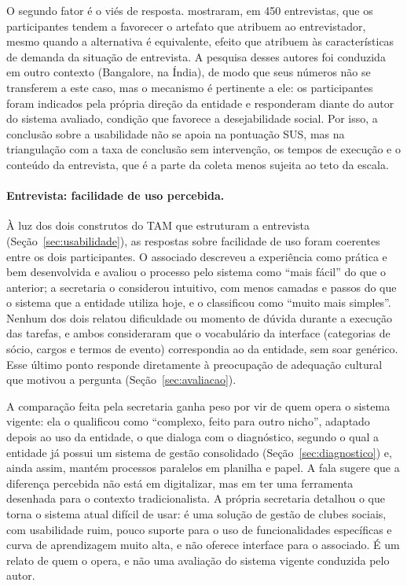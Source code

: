\documentclass[12pt,a4paper]{article}
\begin{document}
O segundo fator é o viés de resposta. \textcite{dell2012}
mostraram, em 450 entrevistas, que os participantes tendem a favorecer o artefato que atribuem ao
entrevistador, mesmo quando a alternativa é equivalente, efeito que atribuem às características de
demanda da situação de entrevista. A pesquisa desses autores foi conduzida em outro contexto
(Bangalore, na Índia), de modo que seus números não se transferem a este caso, mas o
mecanismo é pertinente a ele: os participantes foram indicados pela própria direção da entidade e
responderam diante do autor do sistema avaliado, condição que favorece a desejabilidade social.
Por isso, a conclusão sobre a usabilidade não se apoia na pontuação SUS, mas na triangulação com a
taxa de conclusão sem intervenção, os tempos de execução e o conteúdo da entrevista, que é a parte
da coleta menos sujeita ao teto da escala.

\paragraph{Entrevista: facilidade de uso percebida.} À luz dos dois construtos do TAM
\parencite{davis1989} que estruturam a entrevista (Seção~\ref{sec:usabilidade}), as respostas sobre
facilidade de uso foram coerentes entre os dois participantes. O associado descreveu a experiência
como prática e bem desenvolvida e avaliou o processo pelo sistema como \enquote{mais fácil} do que o
anterior; a secretaria o considerou intuitivo, com menos camadas e passos do que o sistema que a
entidade utiliza hoje, e o classificou como \enquote{muito mais simples}. Nenhum dos dois relatou
dificuldade ou momento de dúvida durante a execução das tarefas, e ambos consideraram que o
vocabulário da interface (categorias de sócio, cargos e termos de evento) correspondia ao da
entidade, sem soar genérico. Esse último ponto responde diretamente à preocupação de adequação
cultural que motivou a pergunta (Seção~\ref{sec:avaliacao}).

A comparação feita pela secretaria
ganha peso por vir de quem opera o sistema vigente: ela o qualificou como \enquote{complexo, feito
para outro nicho}, adaptado depois ao uso da entidade, o que dialoga com o diagnóstico, segundo o qual
a entidade já possui um sistema de gestão consolidado (Seção~\ref{sec:diagnostico}) e, ainda assim,
mantém processos paralelos em planilha e papel. A fala sugere que a diferença percebida não está em
digitalizar, mas em ter uma ferramenta desenhada para o contexto tradicionalista. A própria
secretaria detalhou o que torna o sistema atual difícil de usar: é uma solução de gestão de clubes
sociais, com usabilidade ruim, pouco suporte para o uso de funcionalidades específicas e curva de
aprendizagem muito alta, e não oferece interface para o associado. É um relato de quem o opera, e não
uma avaliação do sistema vigente conduzida pelo autor.
\end{document}
